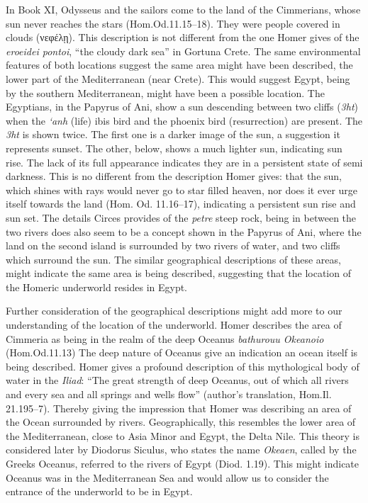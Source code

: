 	In Book XI, Odysseus and the sailors come to the land of the Cimmerians, whose sun never reaches the stars (Hom.Od.11.15–18). They were people covered in clouds (νεφέλῃ). This description is not different from the one Homer gives of the \emph{eroeidei pontoi}, “the cloudy dark sea” in Gortuna Crete. The same environmental features of both locations suggest the same area might have been described, the lower part of the Mediterranean (near Crete). This would suggest Egypt, being by the southern Mediterranean, might have been a possible location. The Egyptians, in the Papyrus of Ani, show a sun descending between two cliffs (\emph{3ht}) when the \emph{‘anh} (life) ibis bird and the phoenix bird (resurrection) are present. The \emph{3ht} is shown twice. The first one is a darker image of the sun, a suggestion it represents sunset. The other, below, shows a much lighter sun, indicating sun rise. The lack of its full appearance indicates they are in a persistent state of semi darkness. This is no different from the description Homer gives: that the sun, which shines with rays would never go to star filled heaven, nor does it ever urge itself towards the land (Hom. Od. 11.16–17), indicating a persistent sun rise and sun set. The details Circes provides of the \emph{petre} steep rock, being in between the two rivers does also seem to be a concept shown in the Papyrus of Ani, where the land on the second island is surrounded by two rivers of water, and two cliffs which surround the sun. The similar geographical descriptions of these areas, might indicate the same area is being described, suggesting that the location of the Homeric underworld resides in Egypt.
	
	
	
	
	Further consideration of the geographical descriptions might add more to our understanding of the location of the underworld. Homer describes the area of Cimmeria as being in the realm of the deep Oceanus \emph{bathurouu Okeanoio} (Hom.Od.11.13) The deep nature of Oceanus give an indication an ocean itself is being described. Homer gives a profound description of this mythological body of water in the \emph{Iliad}: “The great strength of deep Oceanus, out of which all rivers and every sea and all springs and wells flow” (author’s translation, Hom.Il. 21.195–7). Thereby giving the impression that Homer was describing an area of the Ocean surrounded by rivers. Geographically, this resembles the lower area of the Mediterranean, close to Asia Minor and Egypt, the Delta Nile. This theory is considered later by Diodorus Siculus, who states the name \emph{Okeaen}, called by the Greeks Oceanus, referred to the rivers of Egypt (Diod. 1.19). This might indicate Oceanus was in the Mediterranean Sea and would allow us to consider the entrance of the underworld to be in Egypt. 
		
